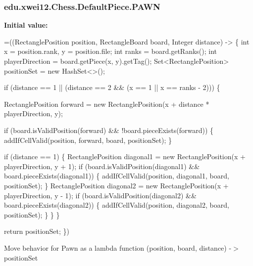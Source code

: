 \subsubsection[{\texorpdfstring{P\+A\+WN}{PAWN}}]{\setlength{\rightskip}{0pt plus 5cm}edu.\+xwei12.\+Chess.\+Default\+Piece.\+P\+A\+WN}\hypertarget{enumedu_1_1xwei12_1_1_chess_1_1_default_piece_ab512e050b8996563bc82f51fad447f39}{}\label{enumedu_1_1xwei12_1_1_chess_1_1_default_piece_ab512e050b8996563bc82f51fad447f39}
{\bfseries Initial value\+:}
\begin{DoxyCode}
=((RectanglePosition position, RectangleBoard board, Integer distance) -> \{
        \textcolor{keywordtype}{int} x = position.rank, y = position.file;
        \textcolor{keywordtype}{int} ranks = board.getRanks();
        \textcolor{keywordtype}{int} playerDirection = board.getPiece(x, y).getTag();
        Set<RectanglePosition> positionSet = \textcolor{keyword}{new} HashSet<>();

        
        \textcolor{keywordflow}{if} (distance == 1 || (distance == 2 && (x == 1 || x == ranks - 2))) \{

            RectanglePosition forward = \textcolor{keyword}{new} RectanglePosition(x + distance * playerDirection, y);
            
            \textcolor{keywordflow}{if} (board.isValidPosition(forward) && !board.pieceExists(forward)) \{
                addIfCellValid(position, forward, board, positionSet);
            \}

            
            \textcolor{keywordflow}{if} (distance == 1) \{
                RectanglePosition diagonal1 = \textcolor{keyword}{new} RectanglePosition(x + playerDirection, y + 1);
                \textcolor{keywordflow}{if} (board.isValidPosition(diagonal1) && board.pieceExists(diagonal1)) \{
                    addIfCellValid(position, diagonal1, board, positionSet);
                \}
                RectanglePosition diagonal2 = \textcolor{keyword}{new} RectanglePosition(x + playerDirection, y - 1);
                \textcolor{keywordflow}{if} (board.isValidPosition(diagonal2) && board.pieceExists(diagonal2)) \{
                    addIfCellValid(position, diagonal2, board, positionSet);
                \}
            \}
        \}

        \textcolor{keywordflow}{return} positionSet;
    \})
\end{DoxyCode}
Move behavior for Pawn as a lambda function (position, board, distance) -\/$>$ position\+Set 
